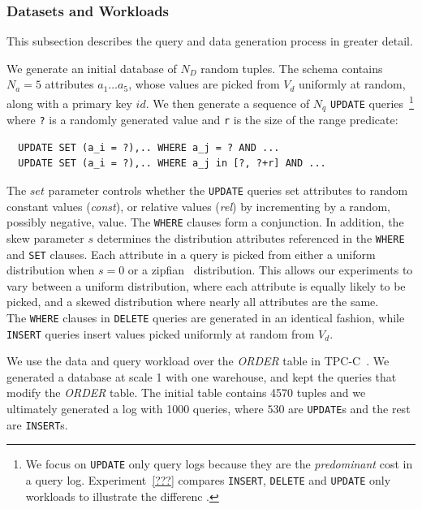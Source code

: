\subsubsection{Datasets and Workloads}

This subsection describes the query and data generation process in greater detail.

 \label{sec:syntheticgen}
We generate an initial database of $N_D$ random tuples.  
The schema contains $N_a=5$ attributes $a_1\ldots a_5$, whose values are
picked from $V_d$ uniformly at random, along with a primary key $id$.
We then generate a sequence of $N_q$ \texttt{UPDATE} queries~\footnote{\scriptsize We focus on
\texttt{UPDATE} only query logs because they are the {\it predominant} cost 
in a query log.  Experiment~\ref{???} compares \texttt{INSERT}, \texttt{DELETE} and \texttt{UPDATE}
only workloads to illustrate the differenc .} where 
\verb|?| is a randomly generated value and \verb|r| is the size of the range predicate: 
{\scriptsize
\begin{verbatim}
  UPDATE SET (a_i = ?),.. WHERE a_j = ? AND ...
  UPDATE SET (a_i = ?),.. WHERE a_j in [?, ?+r] AND ...
\end{verbatim}
}

The $set$ parameter controls whether the \texttt{UPDATE} queries set attributes to random constant values ({\it const}),  
or relative values ({\it rel}) by incrementing by a random, possibly negative, value.  
The \texttt{WHERE} clauses form a conjunction.  
In addition, the skew parameter $s$ determines the distribution attributes referenced in the \texttt{WHERE} and \texttt{SET} clauses.  
Each attribute in a query is picked from either a uniform distribution when $s=0$ or a zipfian~\cite{zipf} distribution.
This allows our experiments to vary between a uniform distribution, where each attribute is
equally likely to be picked, and a skewed distribution where nearly all attributes are the same. \\
The \texttt{WHERE} clauses in \texttt{DELETE} queries are generated in an identical fashion, while
\texttt{INSERT} queries insert values picked uniformly at random from $V_d$.



 We use the data and query workload over the {\it ORDER} table in TPC-C~\cite{tpcc}.  
We generated a database at scale 1 with one warehouse, and kept the queries that modify the
{\it ORDER} table. The initial table contains 4570 tuples and we ultimately generated a log with
1000 queries, where $530$ are \texttt{UPDATE}s and the rest are \texttt{INSERT}s.

